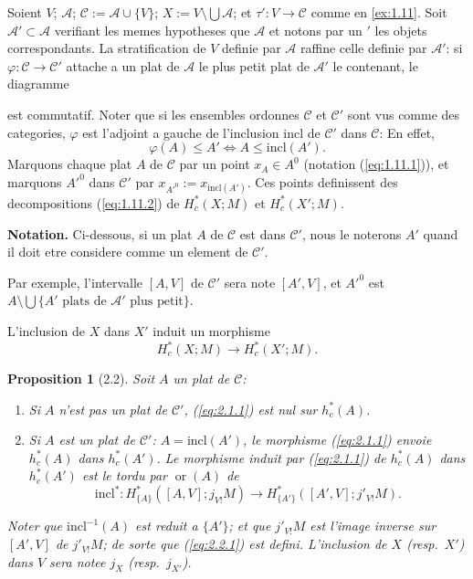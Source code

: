 \documentclass[11pt,a4paper]{article}
\theoremstyle{plain}
\newtheorem{proposition}[theorem]{Proposition}
\theoremstyle{definition}
\newcommand{\ori}{\operatorname{or}}
\begin{document}
Soient $V$; $\mathcal{A}$; $\mathcal{C} := \mathcal{A} \cup \{V\}$; $X := V \setminus \bigcup\mathcal{A}$; et $\tau': V \to \mathcal{C}$ comme en \ref{ex:1.11}. Soit $\mathcal{A}' \subset \mathcal{A}$ verifiant les memes hypotheses que $\mathcal{A}$ et notons par un $'$ les objets correspondants. La stratification de $V$ definie par $\mathcal{A}$ raffine celle definie par $\mathcal{A}'$: si $\varphi: \mathcal{C} \to \mathcal{C}'$ attache a un plat de $\mathcal{A}$ le plus petit plat de $\mathcal{A}'$ le contenant, le diagramme
est commutatif. Noter que si les ensembles ordonnes $\mathcal{C}$ et $\mathcal{C}'$ sont vus comme des categories, $\varphi$ est l'adjoint a gauche de l'inclusion $\mathrm{incl}$ de $\mathcal{C}'$ dans $\mathcal{C}$: En effet,
\[\varphi(A) \leq A' \iff A \leq \mathrm{incl}(A').\]
Marquons chaque plat $A$ de $\mathcal{C}$ par un point $x_A \in A^0$ (notation (\ref{eq:1.11.1})), et marquons $A'^0$ dans $\mathcal{C}'$ par $x_{A'^0} := x_{\mathrm{incl}(A')}$. Ces points definissent des decompositions (\ref{eq:1.11.2}) de $H^*_c(X;M)$ et $H^*_c(X';M)$.

\textbf{Notation.} Ci-dessous, si un plat $A$ de $\mathcal{C}$ est dans $\mathcal{C}'$, nous le noterons $A'$ quand il doit etre considere comme un element de $\mathcal{C}'$.

Par exemple, l'intervalle $[A,V]$ de $\mathcal{C}'$ sera note $[A',V]$, et $A'^0$ est $A \setminus \bigcup\{A' \text{ plats de } \mathcal{A}' \text{ plus petit}\}$.

L'inclusion de $X$ dans $X'$ induit un morphisme
\begin{equation}\label{eq:2.1.1}
H^*_c(X;M) \longrightarrow H^*_c(X';M).
\tag{2.1.1}
\end{equation}

\begin{proposition}[2.2]\label{prop:2.2}
Soit $A$ un plat de $\mathcal{C}$:
\begin{enumerate}[label=(\roman*)]
\item Si $A$ n'est pas un plat de $\mathcal{C}'$, (\ref{eq:2.1.1}) est nul sur $h^*_c(A)$.
\item Si $A$ est un plat de $\mathcal{C}'$: $A = \mathrm{incl}(A')$, le morphisme (\ref{eq:2.1.1}) envoie $h^*_c(A)$ dans $h^*_c(A')$. Le morphisme induit par (\ref{eq:2.1.1}) de $h^*_c(A)$ dans $h^*_c(A')$ est le tordu par $\ori(A)$ de
\begin{equation}\label{eq:2.2.1}
\mathrm{incl}^*: H^*_{\{A\}}([A,V];j_{V!}M) \longrightarrow H^*_{\{A'\}}([A',V];j'_{V!}M).
\tag{2.2.1}
\end{equation}
\end{enumerate}
Noter que $\mathrm{incl}^{-1}(A)$ est reduit a $\{A'\}$; et que $j'_{V!}M$ est l'image inverse sur $[A',V]$ de $j'_{V!}M$; de sorte que (\ref{eq:2.2.1}) est defini. L'inclusion de $X$ (resp.~$X'$) dans $V$ sera notee $j_X$ (resp.~$j_{X'}$).
\end{proposition}
\end{document}
